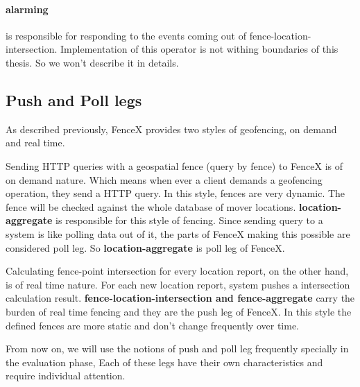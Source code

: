 \documentclass[a4]{report}
\begin{document}
        \paragraph{alarming} is responsible for responding to the events coming out of fence-location-intersection.
        Implementation of this operator is not withing boundaries of this thesis.
        So we won't describe it in details.

        \subsection{Push and Poll legs}
        As described previously, FenceX provides two styles of geofencing, on demand and real time.

        Sending HTTP queries with a geospatial fence (query by fence) to FenceX is of on demand nature.
        Which means when ever a client demands a geofencing operation, they send a HTTP query.
        In this style, fences are very dynamic.
        The fence will be checked against the whole database of mover locations.
        \textbf{location-aggregate} is responsible for this style of fencing.
        Since sending query to a system is like polling data out of it, the parts of FenceX making this possible are
        considered poll leg.
        So \textbf{location-aggregate} is poll leg of FenceX.

        Calculating fence-point intersection for every location report, on the other hand, is of real time nature.
        For each new location report, system pushes a intersection calculation result.
        \textbf{fence-location-intersection and fence-aggregate} carry the burden of real time fencing and they are the
        push leg of FenceX.
        In this style the defined fences are more static and don't change frequently over time.

        From now on, we will use the notions of push and poll leg frequently specially in the evaluation phase, Each of
        these legs have their own characteristics and require individual attention.
\end{document}
